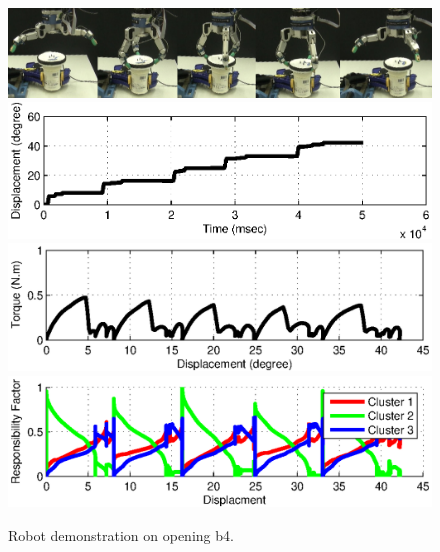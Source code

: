 \begin{figure}
  \centering
  \includegraphics[width=15cm]{./fig/demo_b4.jpg}
  \includegraphics[width=15cm]{./fig/demo_b4_s.eps}
  \includegraphics[width=15cm]{./fig/demo_b4_T.eps}
  \includegraphics[width=15cm]{./fig/demo_b4_rf.eps}
  \caption{ \scriptsize{Robot demonstration on opening b4.}
}
\label{fig:demo_b4}
\end{figure}

